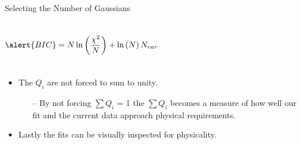 \documentclass[10pt]{beamer}
\begin{document}
\begin{frame}[fragile]{Selecting the Number of Gaussians}
\begin{columns}[T,onlytextwidth]
	\begin{equation} \label{eq:BIC}
		\alert{BIC} = N \ln\left( \frac{\chi^2}{N} \right) +  \ln\left( N \right) N_{var}
	\end{equation}
	
	\end{columns} 
	
	\begin{itemize}
		\pause
		\item The \alert{$Q_i$ are not forced to sum to unity}.
			\begin{itemize}
				\item[--] By not forcing $\sum Q_i$ = 1 the $\sum Q_i$ becomes a measure of how well our fit and the current data approach physical requirements. 
			\end{itemize}
		\pause
		\item Lastly the fits can be \alert{visually} inspected for physicality. 
	\end{itemize}
		
\end{frame}
\end{document}
